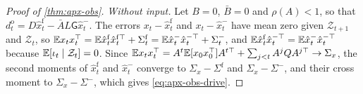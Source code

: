 \begin{proof}[Proof of \cref{thm:apx-obs}]
\emph{Without input.} Let $B=0$, $\bar B=0$ and $\rho(A)<1$, so that $d^{\mathrm o}_t=D\hat x^{\mathrm f}_t-\bar AL\mathsf G\hat x^-_t$. The errors $x_t-\hat x^{\mathrm f}_t$ and $x_t-\hat x^-_t$ have mean zero given $\mathcal Z_{t+1}$ and $\mathcal Z_t$, so $\mathbb{E} x_tx_t^\top=\mathbb{E}\hat x^{\mathrm f}_t\hat x^{\mathrm f\top}_t+\Sigma^{\mathrm f}_t=\mathbb{E}\hat x^-_t\hat x^{-\top}_t+\Sigma^-_t$, and $\mathbb{E}\hat x^{\mathrm f}_t\hat x^{-\top}_t=\mathbb{E}\hat x^-_t\hat x^{-\top}_t$ because $\mathbb{E}[\iota_t\mid\mathcal Z_t]=0$. Since $\mathbb{E} x_tx_t^\top=A^t\mathbb{E}[x_0x_0^\top]A^{t\top}+\sum_{j<t}A^jQA^{j\top}\to\Sigma_x$, the second moments of $\hat x^{\mathrm f}_t$ and $\hat x^-_t$ converge to $\Sigma_x-\Sigma^{\mathrm f}$ and $\Sigma_x-\Sigma^-$, and their cross moment to $\Sigma_x-\Sigma^-$, which gives \eqref{eq:apx-obs-drive}.
\end{proof}


